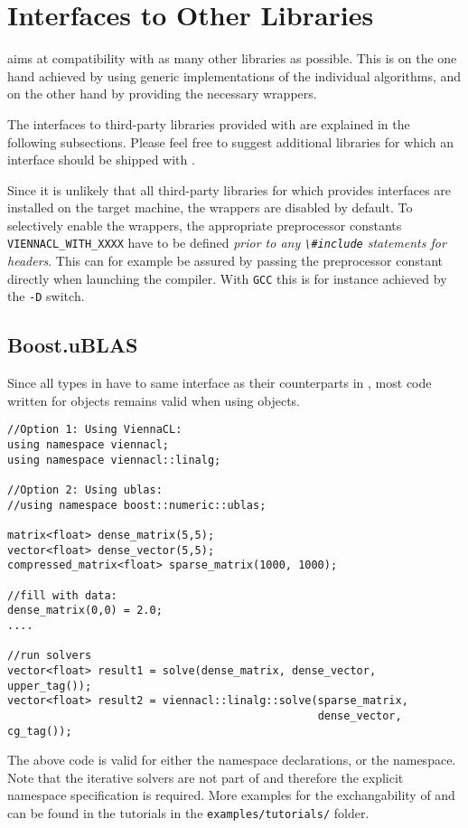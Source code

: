 \chapter{Interfaces to Other Libraries} \label{chap:other-libs}
{\ViennaCL} aims at compatibility with as many other libraries as possible.
This is on the one hand achieved by using generic implementations of the individual algorithms,
and on the other hand by providing the necessary wrappers.

The interfaces to third-party libraries provided with {\ViennaCL} are explained in the following subsections.
Please feel free to suggest additional libraries for which an interface should be shipped with {\ViennaCL}.

Since it is unlikely that all third-party libraries for which {\ViennaCL} provides interfaces are installed
on the target machine, the wrappers are disabled by default. To selectively enable the wrappers,
the appropriate preprocessor constants \lstinline|VIENNACL_WITH_XXXX| have to be defined \emph{prior to any 
\lstinline|\#include| statements for {\ViennaCL} headers}. This can for example be assured by passing the
preprocessor constant directly when launching the compiler. With \lstinline|GCC| this is for instance 
achieved by the \lstinline|-D| switch.

\section{Boost.uBLAS}
Since all types in {\ViennaCL} have to same interface as their counterparts in {\ublas},
most code written for {\ViennaCL} objects remains valid when using {\ublas} objects.
\begin{lstlisting}
//Option 1: Using ViennaCL:
using namespace viennacl;
using namespace viennacl::linalg;

//Option 2: Using ublas:
//using namespace boost::numeric::ublas;

matrix<float> dense_matrix(5,5);
vector<float> dense_vector(5,5);
compressed_matrix<float> sparse_matrix(1000, 1000);

//fill with data:
dense_matrix(0,0) = 2.0;
....

//run solvers
vector<float> result1 = solve(dense_matrix, dense_vector, upper_tag());
vector<float> result2 = viennacl::linalg::solve(sparse_matrix,
                                                dense_vector, cg_tag());
\end{lstlisting}
The above code is valid for either the {\ViennaCL} namespace declarations, or the {\ublas} namespace. Note that the
iterative solvers are not part of {\ublas} and therefore the explicit namespace specification is required. More examples
for the exchangability of {\ublas} and {\ViennaCL} can be found in the tutorials in the \texttt{examples/tutorials/} folder.

